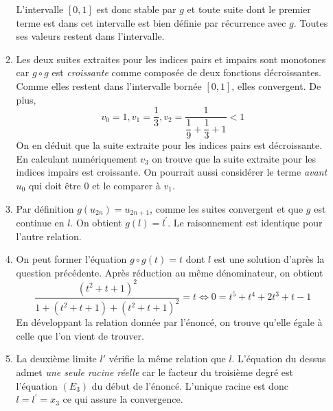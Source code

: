\begin{enumerate}
\begin{enumerate}
\begin{displaymath}
\end{displaymath}
L'intervalle $[0,1]$ est donc stable par $g$ et toute suite dont le premier terme est dans cet intervalle est bien définie par récurrence avec $g$. Toutes ses valeurs restent dans l'intervalle.
\item Les deux suites extraites pour les indices pairs et impairs sont monotones car $g\circ g$ est \emph{croissante} comme composée de deux fonctions décroissantes. Comme elles restent dans l'intervalle bornée $[0,1]$, elles convergent.\newline
De plus, 
\begin{displaymath}
 v_0=1 , v_1=\dfrac{1}{3}, v_2=\dfrac{1}{\dfrac{1}{9}+\dfrac{1}{3}+1}<1
\end{displaymath}
On en déduit que la suite extraite pour les indices pairs est décroissante. En calculant numériquement $v_3$ on trouve que la suite extraite pour les indices impairs est croissante. On pourrait aussi considérer le terme \emph{avant} $u_0$ qui doit être $0$ et le comparer à $v_1$.
\item Par définition $g(u_{2n})=u_{2n+1}$, comme les suites convergent et que $g$ est continue en $l$. On obtient $g(l)=l^\prime$. Le raisonnement est identique pour l'autre relation.
\item On peut former l'équation $g\circ g (t)=t$ dont $l$ est une solution d'après la question précédente. Après réduction au même dénominateur, on obtient
\begin{displaymath}
 \frac{(t^2+t+1)^2}{1+(t^2+t+1)+(t^2+t+1)^2} = t
\Leftrightarrow
0=t^5 + t^4 +2t^3 +t -1
\end{displaymath}
En développant la relation donnée par l'énoncé, on trouve qu'elle égale à celle que l'on vient de trouver. 
\item La deuxième limite $l'$ vérifie la même relation que $l$. L'équation du dessus admet \emph{une seule racine réelle} car le facteur du troisième degré est l'équation $(E_3)$ du début de l'énoncé.\newline 
L'unique racine est donc $l=l^\prime = x_3$ ce qui assure la convergence.

\end{enumerate}

\end{enumerate}